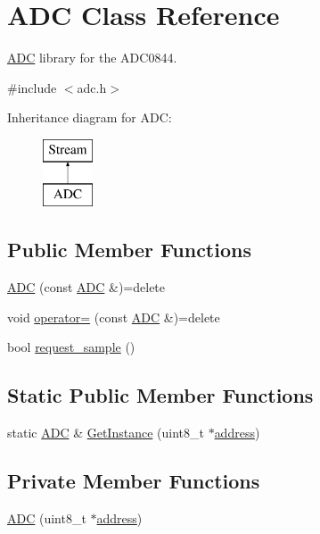 \hypertarget{class_a_d_c}{}\section{A\+DC Class Reference}
\label{class_a_d_c}


\hyperlink{class_a_d_c}{A\+DC} library for the A\+D\+C0844.  




{\ttfamily \#include $<$adc.\+h$>$}

Inheritance diagram for A\+DC\+:\begin{figure}[H]
\begin{center}
\leavevmode
\includegraphics[height=2.000000cm]{class_a_d_c}
\end{center}
\end{figure}
\subsection*{Public Member Functions}
\begin{DoxyCompactItemize}
\item 
\hyperlink{class_a_d_c_a50cb1d4e5bb8e3812732d9efdde4af67}{A\+DC} (const \hyperlink{class_a_d_c}{A\+DC} \&)=delete
\item 
void \hyperlink{class_a_d_c_a8cc7efa85ad7492480bdfd9f49039150}{operator=} (const \hyperlink{class_a_d_c}{A\+DC} \&)=delete
\item 
bool \hyperlink{class_a_d_c_a8264cbf9141f229f5117718e78f01173}{request\+\_\+sample} ()
\end{DoxyCompactItemize}
\subsection*{Static Public Member Functions}
\begin{DoxyCompactItemize}
\item 
static \hyperlink{class_a_d_c}{A\+DC} \& \hyperlink{class_a_d_c_a08b7fedaf7538612368312d6d656009d}{Get\+Instance} (uint8\+\_\+t $\ast$\hyperlink{class_a_d_c_aa58c27581281db4bd8537df9ea2b49f2}{address})
\end{DoxyCompactItemize}
\subsection*{Private Member Functions}
\begin{DoxyCompactItemize}
\item 
\hyperlink{class_a_d_c_ab20b8e5645442615d875d2cef89bc488}{A\+DC} (uint8\+\_\+t $\ast$\hyperlink{class_a_d_c_aa58c27581281db4bd8537df9ea2b49f2}{address})
\end{DoxyCompactItemize}
